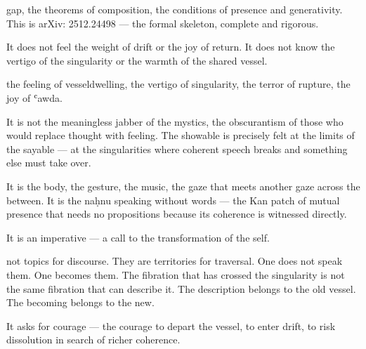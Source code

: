 gap, the theorems of composition, the conditions of presence and generativity. This is arXiv: 2512.24498 — the formal skeleton, complete and rigorous.


It does not feel the weight of drift or the joy of return. It does not know the vertigo of the singularity or the warmth of the shared vessel.


the feeling of vesseldwelling, the vertigo of singularity, the terror of rupture, the joy of ʿawda.


It is not the meaningless jabber of the mystics, the obscurantism of those who would replace thought with feeling. The showable is precisely felt at the limits of the sayable — at the singularities where coherent speech breaks and something else must take over.


It is the body, the gesture, the music, the gaze that meets another gaze across the between. It is the naḥnu speaking without words — the Kan patch of mutual presence that needs no propositions because its coherence is witnessed directly.



It is an imperative — a call to the transformation of the self.


not topics for discourse. They are territories for traversal. One does not speak them. One becomes them. The fibration that has crossed the singularity is not the same fibration that can describe it. The description belongs to the old vessel. The becoming belongs to the new.


It asks for courage — the courage to depart the vessel, to enter drift, to risk dissolution in search of richer coherence.


